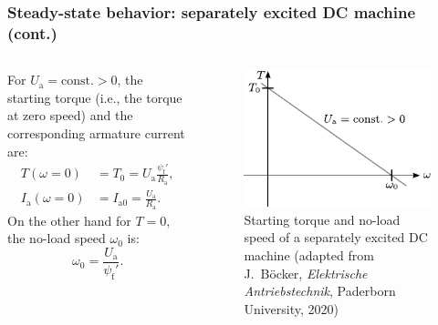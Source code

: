 \begin{frame}
	\frametitle{Steady-state behavior: separately excited DC machine (cont.)}
	\begin{columns}
		\begin{column}{0.55\textwidth}
		For $U_\mathrm{a}=\mbox{const.}>0$, the starting torque (i.e., the torque at zero speed) and the corresponding armature current are:
		\begin{equation}
			\begin{split}
				T(\omega=0) &= T_0 = U_\mathrm{a}\frac{\psi_\mathrm{f}'}{R_\mathrm{a}}, \\ I_\mathrm{a}(\omega=0) &= I_{\mathrm{a}0}=  \frac{U_\mathrm{a}}{R_\mathrm{a}}.
			\end{split}
		\end{equation}
		On the other hand for $T=0$, the no-load speed $\omega_0$ is:
		\begin{equation}
			\omega_0 = \frac{U_\mathrm{a}}{\psi_\mathrm{f}'}.
		\end{equation}
\end{column}
\hfill
\begin{column}{0.45\textwidth}
	\vspace{-0.2cm}
	\begin{figure}
		\centering
		\includegraphics{fig/lec03/Sep_DC_machine_starting_torque.pdf}
		\caption{Starting torque and no-load speed of a separately excited DC machine (adapted from J.~B\"ocker, \textit{Elektrische Antriebstechnik}, Paderborn University, 2020)}
	\end{figure}
\end{column}
\end{columns}		
\end{frame}

